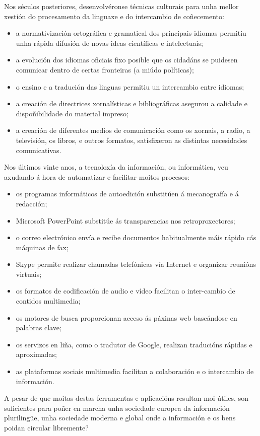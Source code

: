 \begin{multicols}{2}
Nos séculos posteriores, desenvolvéronse técnicas culturais para unha mellor xestión do procesamento da linguaxe e do intercambio de coñecemento:
\begin{itemize}
\item a normativización ortográfica e gramatical dos principais idiomas permitiu unha rápida difusión de novas ideas científicas e intelectuais;
\item a evolución dos idiomas oficiais fixo posible que os cidadáns se puidesen comunicar dentro de certas fronteiras (a miúdo políticas);
\item o ensino e a tradución das linguas permitiu un intercambio entre idiomas;
\item a creación de directrices xornalísticas e bibliográficas asegurou a calidade e dispoñibilidade do material impreso;
\item a creación de diferentes medios de comunicación como os xornais, a radio, a televisión, os libros, e outros formatos, satisfixeron as distintas necesidades comunicativas. 
\end{itemize}
Nos últimos vinte anos, a tecnoloxía da información, ou informática, veu axudando á hora de automatizar e facilitar moitos procesos:
\begin{itemize}
\item os programas informáticos de autoedición substitúen á mecanografía e á redacción;
\item Microsoft PowerPoint substitúe ás transparencias nos retroproxectores;
\item o correo electrónico envía e recibe documentos habitualmente máis rápido cás máquinas de fax; 
\item Skype permite realizar chamadas telefónicas vía Internet e organizar reunións virtuais;
\item os formatos de codificación de audio e vídeo facilitan o inter-cambio de contidos multimedia;
\item os motores de busca proporcionan acceso ás páxinas web baseándose en palabras clave;
\item os servizos en liña, como o tradutor de Google, realizan traducións rápidas e aproximadas;
\item as plataformas sociais multimedia facilitan a colaboración e o intercambio de información.
\end{itemize}
A pesar de que moitas destas ferramentas e aplicacións resultan moi útiles, son suficientes para poñer en marcha unha sociedade europea da información plurilingüe, unha sociedade moderna e global onde a información e os bens poidan circular libremente?


\end{multicols}
